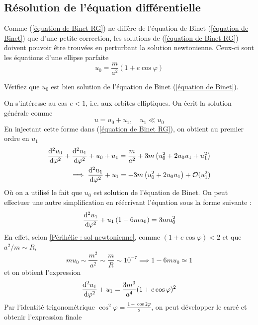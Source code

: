 \subsection{Résolution de l'équation différentielle}
Comme (\ref{équation de Binet RG}) ne diffère de l'équation de Binet (\ref{équation de Binet}) que d'une petite correction, les solutions de (\ref{équation de Binet RG}) doivent pouvoir être trouvées en perturbant la solution newtonienne. Ceux-ci sont les équations d'une ellipse parfaite
\begin{equation}
    \label{Périhélie : sol newtonienne}
    u_0 = \frac{m}{a^2} (1 +e \cos\varphi)
\end{equation}
\begin{exerc}
    Vérifiez que $u_0$ est bien solution de l'équation de Binet (\ref{équation de Binet}).
\end{exerc}
On s'intéresse au cas $e<1$, i.e. aux orbites elliptiques. On écrit la solution générale comme
\begin{equation}
    u = u_0 +u_1, \quad u_1 \ll u_0
\end{equation}
En injectant cette forme dans (\ref{équation de Binet RG}), on obtient au premier ordre en $u_1$
\begin{align}
    \frac{\mathrm{d}^2 u_0}{\mathrm{d} \varphi^2} +\frac{\mathrm{d}^2 u_1}{\mathrm{d} \varphi^2} + u_0 + u_1 = \frac{m}{a^2} + 3m \left( u_0^2 + 2u_0u_1 +u_1^2 \right)\\
    \implies \frac{\mathrm{d}^2 u_1}{\mathrm{d} \varphi^2} + u_1 = + 3m \left( u_0^2 +2u_0u_1 \right) + \mathcal{O}(u_1^2)
\end{align}
Où on a utilisé le fait que $u_0$ est solution de l'équation de Binet. On peut effectuer une autre simplification en réécrivant l'équation sous la forme suivante :
\begin{equation}
    \frac{\mathrm{d}^2 u_1}{\mathrm{d} \varphi^2} + u_1 \left( 1 - 6m u_0 \right) = 3m  u_0^2
\end{equation}
En effet, selon \ref{Périhélie : sol newtonienne}, comme $(1+ e\cos \varphi) < 2$ et que $a^2/m \sim R$, 
\begin{equation}
    m u_0 \sim \frac{m^2}{a^2} \sim \frac{m}{R} \sim 10^{-7} \implies 1- 6mu_0 \simeq 1
\end{equation}
et on obtient l'expression
\begin{equation}
    \frac{\mathrm{d}^2 u_1}{\mathrm{d} \varphi^2} + u_1  = \frac{3m^3}{a^4} (1 +e \cos\varphi)^2
\end{equation}
Par l'identité trigonométrique $\cos^2\varphi = \frac{1 + \cos 2\varphi}{2}$, on peut développer le carré et obtenir l'expression finale

